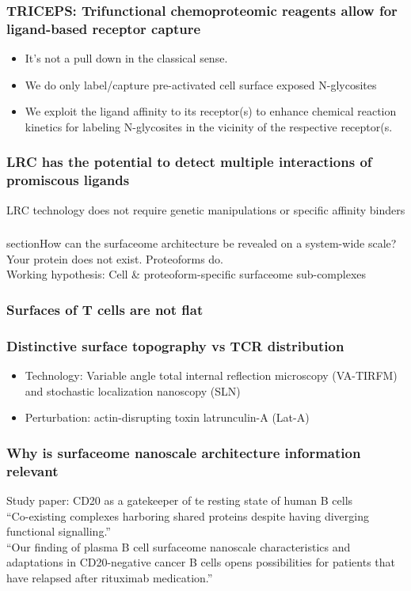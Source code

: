 \begin{itemize}
\begin{itemize}
\subsubsection{TRICEPS: Trifunctional chemoproteomic reagents allow for ligand-based receptor capture}
\begin{itemize}
    \item It’s not a pull down in the classical sense.
\item We do only label/capture pre-activated cell surface exposed N-glycosites
\item We exploit the ligand affinity to its receptor(s) to enhance chemical reaction kinetics for
labeling N-glycosites in the vicinity of the respective receptor(s.
\end{itemize}
\subsubsection{LRC has the potential to detect multiple interactions of promiscous ligands}
LRC technology does not require genetic manipulations or specific affinity binders

\subsubsection{}section{How can the surfaceome architecture be revealed on a
system-wide scale?}
Your protein does not exist. Proteoforms do.
\\Working hypothesis: Cell & proteoform-specific surfaceome sub-complexes

\subsubsection{Surfaces of T cells are not flat}

\subsubsection{Distinctive surface topography vs TCR distribution}
\begin{itemize}
    \item Technology: Variable angle total internal reflection microscopy (VA-TIRFM) and stochastic localization nanoscopy (SLN)
\item Perturbation: actin-disrupting toxin latrunculin-A (Lat-A)
\end{itemize}

\subsubsection{Why is surfaceome nanoscale architecture information relevant}
Study paper: CD20 as a gatekeeper of te resting state of human B cells
\\“Co-existing complexes harboring
shared proteins despite having
diverging functional signalling.”
\\“Our finding of plasma B cell surfaceome nanoscale
characteristics and adaptations in CD20-negative
cancer B cells opens possibilities for patients that have
relapsed after rituximab medication.”


\end{itemize}
\end{itemize}
